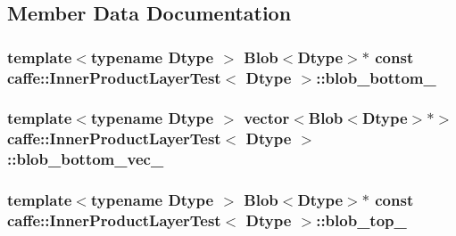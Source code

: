 \subsection{Member Data Documentation}
\hypertarget{classcaffe_1_1_inner_product_layer_test_adfa9bbdc3882fe32e7f73a776cf9baba}{
\subsubsection[{blob\+\_\+bottom\+\_\+}]{\setlength{\rightskip}{0pt plus 5cm}template$<$typename Dtype $>$ {\bf Blob}$<$Dtype$>$$\ast$ const {\bf caffe\+::\+Inner\+Product\+Layer\+Test}$<$ Dtype $>$\+::blob\+\_\+bottom\+\_\+\hspace{0.3cm}{\ttfamily [protected]}}}\label{classcaffe_1_1_inner_product_layer_test_adfa9bbdc3882fe32e7f73a776cf9baba}
\hypertarget{classcaffe_1_1_inner_product_layer_test_acf2d5e26939568693b5fe360ce630d84}{
\subsubsection[{blob\+\_\+bottom\+\_\+vec\+\_\+}]{\setlength{\rightskip}{0pt plus 5cm}template$<$typename Dtype $>$ vector$<${\bf Blob}$<$Dtype$>$$\ast$$>$ {\bf caffe\+::\+Inner\+Product\+Layer\+Test}$<$ Dtype $>$\+::blob\+\_\+bottom\+\_\+vec\+\_\+\hspace{0.3cm}{\ttfamily [protected]}}}\label{classcaffe_1_1_inner_product_layer_test_acf2d5e26939568693b5fe360ce630d84}
\hypertarget{classcaffe_1_1_inner_product_layer_test_aba9a6f499c414653250a4cb9e81e0e70}{
\subsubsection[{blob\+\_\+top\+\_\+}]{\setlength{\rightskip}{0pt plus 5cm}template$<$typename Dtype $>$ {\bf Blob}$<$Dtype$>$$\ast$ const {\bf caffe\+::\+Inner\+Product\+Layer\+Test}$<$ Dtype $>$\+::blob\+\_\+top\+\_\+\hspace{0.3cm}{\ttfamily [protected]}}}\label{classcaffe_1_1_inner_product_layer_test_aba9a6f499c414653250a4cb9e81e0e70}
